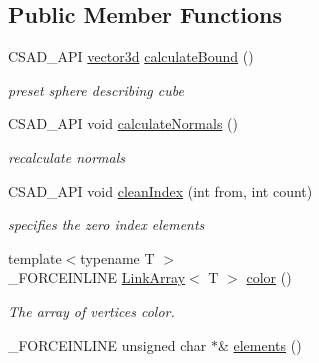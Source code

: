 \subsection*{Public Member Functions}
\begin{DoxyCompactItemize}
\item 
\hypertarget{classcsad_1_1_mesh_a2f2da578fdd319ce1840a76d6f20059b}{C\-S\-A\-D\-\_\-\-A\-P\-I \hyperlink{classbt_1_1vector3d}{vector3d} \hyperlink{classcsad_1_1_mesh_a2f2da578fdd319ce1840a76d6f20059b}{calculate\-Bound} ()}\label{classcsad_1_1_mesh_a2f2da578fdd319ce1840a76d6f20059b}

\begin{DoxyCompactList}\small\item\em preset sphere describing cube \end{DoxyCompactList}\item 
\hypertarget{classcsad_1_1_mesh_af4d2f34a11ddd431bb3e692a99fceb59}{C\-S\-A\-D\-\_\-\-A\-P\-I void \hyperlink{classcsad_1_1_mesh_af4d2f34a11ddd431bb3e692a99fceb59}{calculate\-Normals} ()}\label{classcsad_1_1_mesh_af4d2f34a11ddd431bb3e692a99fceb59}

\begin{DoxyCompactList}\small\item\em recalculate normals \end{DoxyCompactList}\item 
\hypertarget{classcsad_1_1_mesh_afb71bb61d549c453bea53ea03d20ce02}{C\-S\-A\-D\-\_\-\-A\-P\-I void \hyperlink{classcsad_1_1_mesh_afb71bb61d549c453bea53ea03d20ce02}{clean\-Index} (int from, int count)}\label{classcsad_1_1_mesh_afb71bb61d549c453bea53ea03d20ce02}

\begin{DoxyCompactList}\small\item\em specifies the zero index elements \end{DoxyCompactList}\item 
\hypertarget{classcsad_1_1_mesh_ac229d71ea69bea49ea15770ce6635d4b}{{\footnotesize template$<$typename T $>$ }\\\-\_\-\-F\-O\-R\-C\-E\-I\-N\-L\-I\-N\-E \hyperlink{classbt_1_1_link_array}{Link\-Array}$<$ T $>$ \hyperlink{classcsad_1_1_mesh_ac229d71ea69bea49ea15770ce6635d4b}{color} ()}\label{classcsad_1_1_mesh_ac229d71ea69bea49ea15770ce6635d4b}

\begin{DoxyCompactList}\small\item\em The array of vertices color. \end{DoxyCompactList}\item 
\hypertarget{classcsad_1_1_mesh_a3c75a7c40cb397153c55c38397056e75}{\-\_\-\-F\-O\-R\-C\-E\-I\-N\-L\-I\-N\-E unsigned char $\ast$\& \hyperlink{classcsad_1_1_mesh_a3c75a7c40cb397153c55c38397056e75}{elements} ()}\label{classcsad_1_1_mesh_a3c75a7c40cb397153c55c38397056e75}


\end{DoxyCompactItemize}
